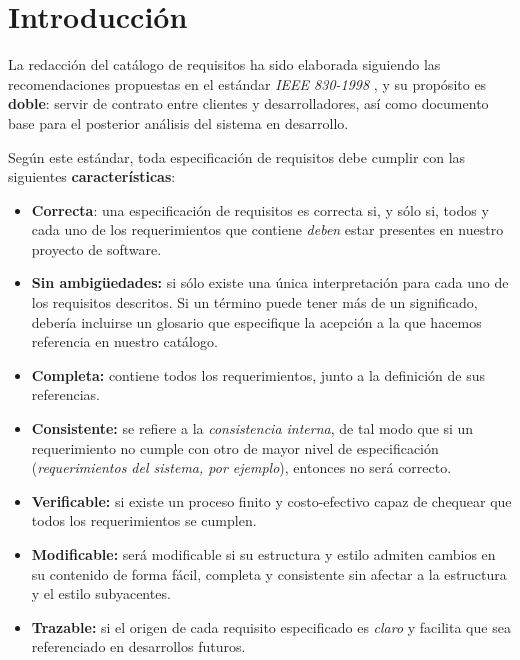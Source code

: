 
\section{Introducción}

La redacción del catálogo de requisitos ha sido elaborada siguiendo las recomendaciones propuestas en el estándar \textit{IEEE 830-1998} \cite{1998IEEESpecifications}, y su propósito es \textbf{doble}: servir de contrato entre clientes y desarrolladores, así como documento base para el posterior análisis del sistema en desarrollo.

Según este estándar, toda especificación de requisitos debe cumplir con las siguientes \textbf{características}:

\begin{itemize}
    \item \textbf{Correcta}: una especificación de requisitos es correcta si, y sólo si, todos y cada uno de los requerimientos que contiene \textit{deben} estar presentes en nuestro proyecto de software.
    \item \textbf{Sin ambigüedades:} si sólo existe una única interpretación para cada uno de los requisitos descritos. Si un término puede tener más de un significado, debería incluirse un glosario que especifique la acepción a la que hacemos referencia en nuestro catálogo.
    \item \textbf{Completa:} contiene todos los requerimientos, junto a la definición de sus referencias.
    \item \textbf{Consistente:} se refiere a la \textit{consistencia interna}, de tal modo que si un requerimiento no cumple con otro de mayor nivel de especificación (\textit{requerimientos del sistema, por ejemplo}), entonces no será correcto.
    \item \textbf{Verificable:} si existe un proceso finito y costo-efectivo capaz de chequear que todos los requerimientos se cumplen.
    \item \textbf{Modificable:} será modificable si su estructura y estilo admiten cambios en su contenido de forma fácil, completa y consistente sin afectar a la estructura y el estilo subyacentes.
    \item \textbf{Trazable:} si el origen de cada requisito especificado es \textit{claro} y facilita que sea referenciado en desarrollos futuros.

\end{itemize}



